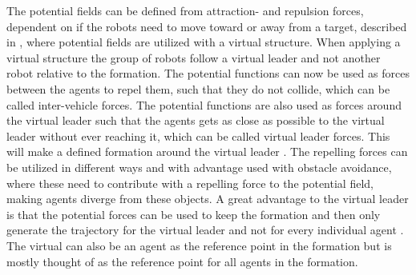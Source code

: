 The potential fields can be defined from attraction- and repulsion forces, dependent on if the robots need to move toward or away from a target, described in \citep{pfmrm}, where potential fields are utilized with a virtual structure. When applying a virtual structure the group of robots follow a virtual leader and not another robot relative to the formation. The potential functions can now be used as forces between the agents to repel them, such that they do not collide, which can be called inter-vehicle forces. The potential functions are also used as forces around the virtual leader such that the agents gets as close as possible to the virtual leader without ever reaching it, which can be called virtual leader forces. This will make a defined formation around the virtual leader \citep{1655803}. The repelling forces can be utilized in different ways and with advantage used with obstacle avoidance, where these need to contribute with a repelling force to the potential field, making agents diverge from these objects. A great advantage to the virtual leader is that the potential forces can be used to keep the formation and then only generate the trajectory for the virtual leader and not for every individual agent \citep{1655803}. The virtual can also be an agent as the reference point in the formation but is mostly thought of as the reference point for all agents in the formation.

